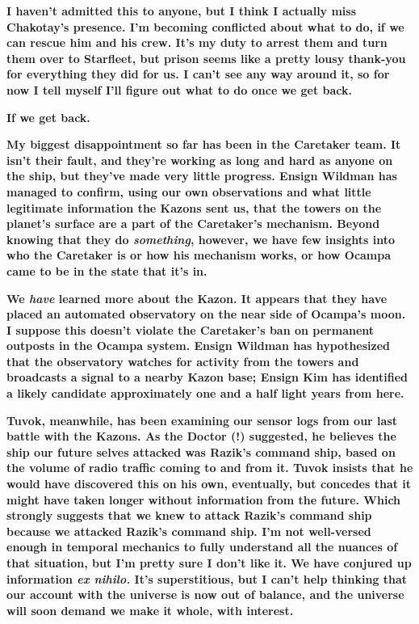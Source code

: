 \documentclass[twoside,letterpaper,12pt]{memoir}
\begin{document}
\textbf{I haven't admitted this to anyone, but I think I actually miss Chakotay's presence. I'm becoming conflicted about what to do, if we can rescue him and his crew. It's my duty to arrest them and turn them over to Starfleet, but prison seems like a pretty lousy thank-you for everything they did for us. I can't see any way around it, so for now I tell myself I'll figure out what to do once we get back.} 

\textbf{If we get back.} 

\textbf{My biggest disappointment so far has been in the Caretaker team. It isn't their fault, and they're working as long and hard as anyone on the ship, but they've made very little progress. Ensign Wildman has managed to confirm, using our own observations and what little legitimate information the Kazons sent us, that the towers on the planet's surface are a part of the Caretaker's mechanism. Beyond knowing that they do \textit{something}, however, we have few insights into who the Caretaker is or how his mechanism works, or how Ocampa came to be in the state that it's in.} 

\textbf{We \textit{have} learned more about the Kazon. It appears that they have placed an automated observatory on the near side of Ocampa's moon. I suppose this doesn't violate the Caretaker's ban on permanent outposts in the Ocampa system. Ensign Wildman has hypothesized that the observatory watches for activity from the towers and broadcasts a signal to a nearby Kazon base; Ensign Kim has identified a likely candidate approximately one and a half light years from here. }

\textbf{Tuvok, meanwhile, has been examining our sensor logs from our last battle with the Kazons. As the Doctor (!) suggested, he believes the ship our future selves attacked was Razik's command ship, based on the volume of radio traffic coming to and from it. Tuvok insists that he would have discovered this on his own, eventually, but concedes that it might have taken longer without information from the future. Which strongly suggests that we knew to attack Razik's command ship because we attacked Razik's command ship. I'm not well-versed enough in temporal mechanics to fully understand all the nuances of that situation, but I'm pretty sure I don't like it. We have conjured up information \textit{ex nihilo.}
It's superstitious, but I can't help thinking that our account with the universe is now out of balance, and the universe will soon demand we make it whole, with interest.} 
\end{document}
